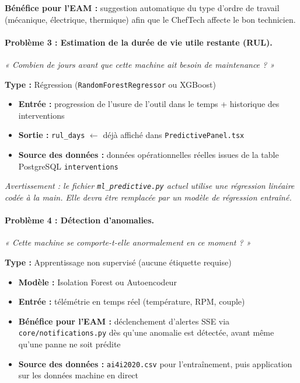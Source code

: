 \textbf{Bénéfice pour l'EAM :} suggestion automatique du type d'ordre de travail (mécanique, électrique, thermique) afin que le ChefTech affecte le bon technicien.

\paragraph{Problème 3 : Estimation de la durée de vie utile restante (RUL).}
\emph{« Combien de jours avant que cette machine ait besoin de maintenance ? »}

\textbf{Type :} Régression (\texttt{RandomForestRegressor} ou XGBoost)

\begin{itemize}
\item \textbf{Entrée :} progression de l'usure de l'outil dans le temps + historique des interventions
\item \textbf{Sortie :} \texttt{rul\_days} $\leftarrow$ déjà affiché dans \texttt{PredictivePanel.tsx}
\item \textbf{Source des données :} données opérationnelles réelles issues de la table PostgreSQL \texttt{interventions}
\end{itemize}

\emph{Avertissement : le fichier \texttt{ml\_predictive.py} actuel utilise une régression linéaire codée à la main. Elle devra être remplacée par un modèle de régression entraîné.}

\paragraph{Problème 4 : Détection d'anomalies.}
\emph{« Cette machine se comporte-t-elle anormalement en ce moment ? »}

\textbf{Type :} Apprentissage non supervisé (aucune étiquette requise)

\begin{itemize}
\item \textbf{Modèle :} Isolation Forest ou Autoencodeur
\item \textbf{Entrée :} télémétrie en temps réel (température, RPM, couple)
\item \textbf{Bénéfice pour l'EAM :} déclenchement d'alertes SSE via \texttt{core/notifications.py} dès qu'une anomalie est détectée, avant même qu'une panne ne soit prédite
\item \textbf{Source des données :} \texttt{ai4i2020.csv} pour l'entraînement, puis application sur les données machine en direct
\end{itemize}


